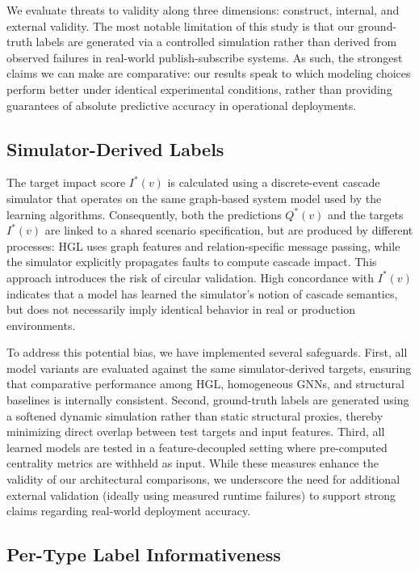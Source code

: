 \documentclass[sigconf,9pt,anonymous]{acmart}
\begin{document}
We evaluate threats to validity along three dimensions: construct, internal, and external validity. The most notable limitation of this study is that our ground-truth labels are generated via a controlled simulation rather than derived from observed failures in real-world publish-subscribe systems. As such, the strongest claims we can make are comparative: our results speak to which modeling choices perform better under identical experimental conditions, rather than providing guarantees of absolute predictive accuracy in operational deployments.

\subsection{Simulator-Derived Labels}

The target impact score $I^*(v)$ is calculated using a discrete-event cascade simulator that operates on the same graph-based system model used by the learning algorithms. Consequently, both the predictions $Q^*(v)$ and the targets $I^*(v)$ are linked to a shared scenario specification, but are produced by different processes: HGL uses graph features and relation-specific message passing, while the simulator explicitly propagates faults to compute cascade impact. This approach introduces the risk of circular validation. High concordance with $I^*(v)$ indicates that a model has learned the simulator’s notion of cascade semantics, but does not necessarily imply identical behavior in real or production environments.



To address this potential bias, we have implemented several safeguards. First, all model variants are evaluated against the same simulator-derived targets, ensuring that comparative performance among HGL, homogeneous GNNs, and structural baselines is internally consistent. Second, ground-truth labels are generated using a softened dynamic simulation rather than static structural proxies, thereby minimizing direct overlap between test targets and input features. Third, all learned models are tested in a feature-decoupled setting where pre-computed centrality metrics are withheld as input. While these measures enhance the validity of our architectural comparisons, we underscore the need for additional external validation (ideally using measured runtime failures) to support strong claims regarding real-world deployment accuracy.

\subsection{Per-Type Label Informativeness}
\end{document}
